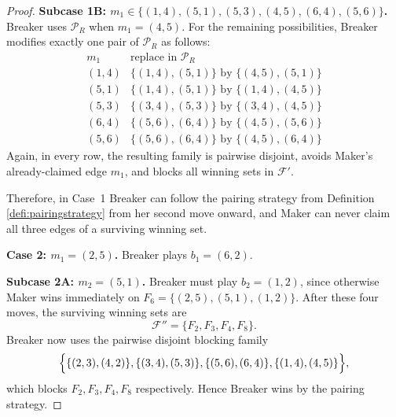 \documentclass{article}
\theoremstyle{definition}
\theoremstyle{plain}
\theoremstyle{remark}
\theoremstyle{definition}
\begin{document}
\begin{proof}
\smallskip
\noindent\textbf{Subcase 1B: $m_1\in\{(1,4),(5,1),(5,3),(4,5),(6,4),(5,6)\}$.}
Breaker uses $\mathcal P_R$ when $m_1=(4,5)$. For the remaining possibilities, Breaker modifies exactly one pair of $\mathcal P_R$ as follows:
\[
\begin{array}{c|c}
m_1 & \text{replace in }\mathcal P_R \\ \hline
(1,4) & \{(1,4),(5,1)\}\text{ by }\{(4,5),(5,1)\}\\[1mm]
(5,1) & \{(1,4),(5,1)\}\text{ by }\{(1,4),(4,5)\}\\[1mm]
(5,3) & \{(3,4),(5,3)\}\text{ by }\{(3,4),(4,5)\}\\[1mm]
(6,4) & \{(5,6),(6,4)\}\text{ by }\{(4,5),(5,6)\}\\[1mm]
(5,6) & \{(5,6),(6,4)\}\text{ by }\{(4,5),(6,4)\}
\end{array}
\]
Again, in every row, the resulting family is pairwise disjoint, avoids Maker's already-claimed edge $m_1$, and blocks all winning sets in $\mathcal F'$.

Therefore, in Case~1 Breaker can follow the pairing strategy from Definition \ref{defi:pairingstrategy} from her second move onward, and Maker can never claim all three edges of a surviving winning set.

\medskip
\noindent\textbf{Case 2: $m_1=(2,5)$.}
Breaker plays $b_1=(6,2)$.

\smallskip
\noindent\textbf{Subcase 2A: $m_2=(5,1)$.}
Breaker must play $b_2=(1,2)$, since otherwise Maker wins immediately on
$F_6=\{(2,5),(5,1),(1,2)\}$.
After these four moves, the surviving winning sets are
\[
\mathcal F''=\{F_2,F_3,F_4,F_8\}.
\]
Breaker now uses the pairwise disjoint blocking family
\[
\Bigl\{
\{(2,3),(4,2)\},
\{(3,4),(5,3)\},
\{(5,6),(6,4)\},
\{(1,4),(4,5)\}
\Bigr\},
\]
which blocks $F_2,F_3,F_4,F_8$ respectively. Hence Breaker wins by the pairing strategy.


\end{proof}
\end{document}
